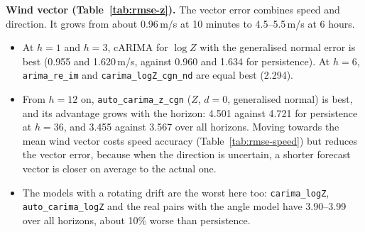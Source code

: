 \documentclass[11pt,a4paper]{article}
\newcommand{\code}[1]{\texttt{#1}}
\begin{document}
\textbf{Wind vector (Table~\ref{tab:rmse-z}).} The vector error combines speed and direction. It
grows from about 0.96\,m/s at 10 minutes to 4.5--5.5\,m/s at 6 hours.
\begin{itemize}
  \item At $h = 1$ and $h = 3$, cARIMA for $\log Z$ with the generalised normal error is best
    (0.955 and 1.620\,m/s, against 0.960 and 1.634 for persistence). At $h = 6$,
    \code{arima\_re\_im} and \code{carima\_logZ\_cgn\_nd} are equal best (2.294).
  \item From $h = 12$ on, \code{auto\_carima\_z\_cgn} ($Z$, $d = 0$, generalised normal) is best,
    and its advantage grows with the horizon: 4.501 against 4.721 for persistence at $h = 36$, and
    3.455 against 3.567 over all horizons. Moving towards the mean wind vector costs speed accuracy
    (Table~\ref{tab:rmse-speed}) but reduces the vector error, because when the direction is
    uncertain, a shorter forecast vector is closer on average to the actual one.
  \item The models with a rotating drift are the worst here too: \code{carima\_logZ},
    \code{auto\_carima\_logZ} and the real pairs with the angle model have 3.90--3.99 over all
    horizons, about 10\% worse than persistence.
\end{itemize}
\end{document}
